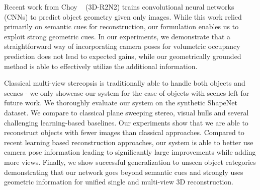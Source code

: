 \documentclass[../thesis.tex]{subfiles}
\begin{document}

Recent work from Choy \etal~\cite{choy20163d} (3D-R2N2) trains convolutional neural networks (CNNs) to predict object geometry given only images. While this work relied primarily on semantic cues for reconstruction, our formulation enables us to exploit strong geometric cues. In our experiments, we demonstrate that a straightforward way of incorporating camera poses for volumetric occupancy prediction does not lead to expected gains, while our geometrically grounded method is able to effectively utilize the additional information.


Classical multi-view stereopsis is traditionally able to handle both objects and scenes - we only showcase our system for the case of objects with scenes left for future work. We thoroughly evaluate our system on the synthetic ShapeNet~\cite{shapenet2015} dataset. We compare to classical plane sweeping stereo, visual hulls and several challenging learning-based baselines. Our experiments show that we are able to reconstruct objects with fewer images than classical approaches. Compared to recent learning based reconstruction approaches, our system is able to better use camera pose information leading to significantly large improvements while adding more views. Finally, we show successful generalization to unseen object categories demonstrating that our network goes beyond semantic cues and strongly uses geometric information for unified single and multi-view 3D reconstruction.
\end{document}
